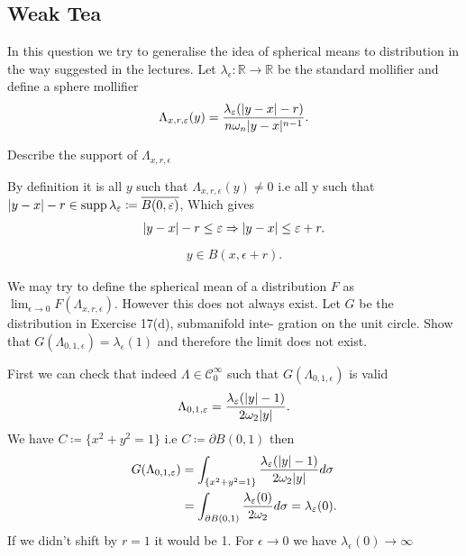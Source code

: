 \subsection*{Weak Tea}
In this question we try to generalise the idea of spherical means to distribution in the way 
suggested in the lectures. Let $\lambda_{\epsilon } : \mathbb{R} \to  \mathbb{R}$ be the standard mollifier and define a sphere mollifier 
\begin{align*}
  \Lambda_{x,r,\varepsilon}(y) = \frac{\lambda_{\varepsilon }(\lvert y-x\rvert-r)}{n \omega_{n}\lvert y-x\rvert^{n-1} }
.\end{align*}
\begin{exercise}[a]
  Describe the support of $\Lambda_{x,r,\epsilon }$ 
\end{exercise}
\begin{solution}
  By definition it is all $y$ such that $\Lambda_{x,r,\epsilon }(y) \neq 0$ i.e all y such that $\lvert y-x\rvert - r \in \operatorname*{supp} \lambda_{\varepsilon} \coloneqq \overline{B(0,\varepsilon)} $,
  Which gives
  \begin{align*}
    \lvert y-x\rvert -r \le  \varepsilon  \Rightarrow \lvert y-x\rvert \le \varepsilon + r
  .\end{align*}
  \begin{align*}
    y \in B(x,\epsilon +r)
  .\end{align*}
\end{solution}
\begin{exercise}[b]
  We may try to define the spherical mean of a distribution $F$ as $\lim_{\epsilon  \to  0} F(\Lambda_{x,r,\epsilon })$. However
this does not always exist. Let $G$ be the distribution in Exercise 17(d), submanifold inte-
gration on the unit circle. Show that $G(\Lambda_{0,1,\epsilon }) = \lambda_{\epsilon }(1)$ and therefore the limit does not
exist.
\end{exercise}
\begin{solution}
  First we can check that indeed  $\Lambda \in  \mathcal{C}^{\infty}_0 $ such that $G(\Lambda_{0,1,\epsilon })$ is valid 
 \begin{align*}
   \Lambda_{0,1,\varepsilon } = \frac{\lambda_{\varepsilon}(\lvert y\rvert-1)}{2 \omega_2 \lvert y\rvert}
 .\end{align*}
 We have $C \coloneqq  \{x^2+y^2 = 1\}  $ i.e $C \coloneqq  \partial B(0,1)$ then 
 \begin{align*}
   G(\Lambda_{0,1,\varepsilon }) &= \int_{\{x^2+y^2=1\}  } \frac{\lambda_{\varepsilon}(\lvert y\rvert-1)}{2 \omega_2 \lvert y\rvert} d\sigma\\
                              &= \int_{\partial B(0,1)}\frac{\lambda_{\varepsilon}(0)}{2\omega_2} d\sigma  = \lambda_{\varepsilon }(0)
 .\end{align*}
 If we didn't  shift by $r=1$ it would be 1. For $\epsilon  \to 0$ we have $\lambda_{\epsilon }(0) \to \infty$
\end{solution}

